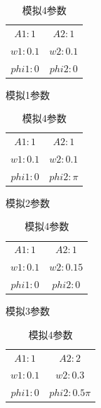 \documentclass[10pt,a4paper]{article}
\begin{document}
\begin{table}[H]
\begin{minipage}[b]{0.2\linewidth}\centering
\begin{tabular}{cc}
\hline
$A1: 1$ &$A2: 1$\\
$w1: 0.1$ &$w2: 0.1$\\
$phi1: 0$ &$phi2: 0$\\
\hline
\end{tabular}
\caption{模拟1参数}\label{tab:8}
\end{minipage}
\hspace{0.5cm}
\begin{minipage}[b]{0.2\linewidth}\centering
\begin{tabular}{cc}
\hline
$A1: 1$ &$A2: 1$\\
$w1: 0.1$ &$w2: 0.1$\\
$phi1: 0$ &$phi2: \pi$\\
\hline
\end{tabular}
\caption{模拟2参数}\label{tab:9}
\end{minipage}
\hspace{0.5cm}
\begin{minipage}[b]{0.2\linewidth}\centering
\begin{tabular}{cc}
\hline
$A1: 1$ &$A2: 1$\\
$w1: 0.1$ &$w2: 0.15$\\
$phi1: 0$ &$phi2: 0$\\
\hline
\end{tabular}
\caption{模拟3参数}\label{tab:10}
\end{minipage}
\hspace{0.5cm}
\begin{minipage}[b]{0.2\linewidth}\centering
\begin{tabular}{cc}
\hline
$A1: 1$ &$A2: 2$\\
$w1: 0.1$ &$w2: 0.3$\\
$phi1: 0$ &$phi2: 0.5\pi$\\
\hline
\end{tabular}
\caption{模拟4参数}\label{tab:11}
\end{minipage}
\end{table}
\end{document}
